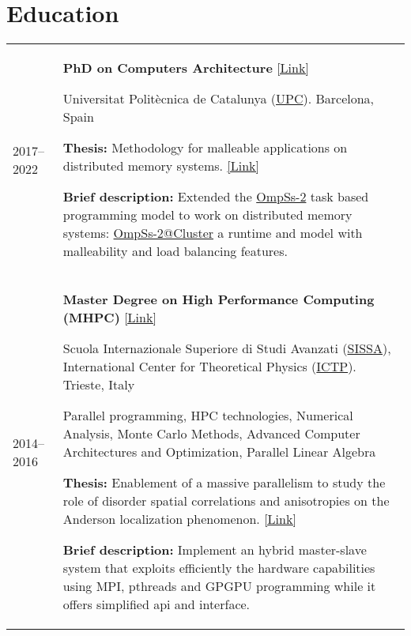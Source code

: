 \documentclass[a4paper,11pt]{article}
\begin{document}
\section{Education}
\begin{tabularx}{\linewidth}{@{}l X@{}}
  2017--2022 & \textbf{PhD on Computers Architecture}
               \href{https://www.ac.upc.edu/en/academics/ph-d/ph-d-programme-by-computer-architecture}{[Link]}

               Universitat Polit\`ecnica de Catalunya (\href{https://www.upc.edu/en}{UPC}).
               Barcelona, Spain

               \textbf{Thesis:} Methodology for malleable applications on distributed memory systems.
               \href{http://paul-carpenter.org/aguilar2022thesis.pdf}{[Link]}

               \textbf{Brief description:} Extended the \href{https://pm.bsc.es/ompss-2}{OmpSs-2} task based programming model to
               work on distributed memory systems: \href{https://github.com/bsc-pm/ompss-2-cluster-releases}{OmpSs-2@Cluster}
               a runtime and model with malleability and load balancing features.
  \\

  2014--2016 & \textbf{Master Degree on High Performance Computing (MHPC)} \href{http://www.mhpc.it}{[Link]}

               Scuola Internazionale Superiore di Studi Avanzati (\href{https://www.sissa.it/}{SISSA}),
               International Center for Theoretical Physics (\href{https://www.ictp.it/}{ICTP}).
               Trieste, Italy

               Parallel programming, HPC technologies, Numerical Analysis, Monte
               Carlo Methods, Advanced Computer Architectures and Optimization,
               Parallel Linear Algebra

               \textbf{Thesis:} Enablement of a massive parallelism to study the role of disorder
               spatial correlations and anisotropies on the Anderson localization phenomenon.
               \href{https://backend.mhpc.sissa.it/sites/default/files/2021-02/JimmyAguilarMena.pdf}{[Link]}

               \textbf{Brief description:} Implement an hybrid master-slave system that exploits efficiently
               the hardware capabilities using MPI, pthreads and GPGPU programming while it offers
               simplified api and interface.
  \\
\end{tabularx}
\end{document}
